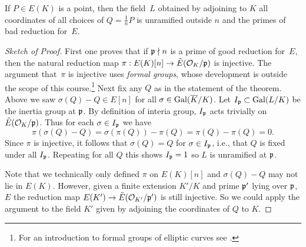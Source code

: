 \begin{theorem}\label{thm:mwunram}
	If $P\in E(K)$ is a point, then the field~$L$ obtained by adjoining to $K$
	all coordinates of all choices of $Q=\frac{1}{n}P$ is unramified
	outside $n$ and the primes of bad reduction for~$E$.
\end{theorem}
\begin{proof}[Sketch of Proof]
	First one proves that if $\mathfrak{p} \nmid n$ is a prime of good reduction
	for~$E$, then the natural reduction map $\pi: E(K)[n] \to
	\tilde{E}(\mathcal{O}_K/\mathfrak{p})$ is injective.  The argument that~$\pi$ is
	injective uses \emph{formal groups}, whose development is outside the
	scope of this course.\footnote{For an introduction to
	formal groups of elliptic curves see \cite[Ch. IV]{silverman:aec}.}
	Next fix any $Q$ as in the statement of the theorem.
	Above we saw $\sigma(Q)-Q \in E[n]$ for
	all $\sigma \in \operatorname{Gal}(\overline{K}/K)$.  Let $I_{\mathfrak{p}}\subset \operatorname{Gal}(L/K)$ be the
	inertia group at $\mathfrak{p}$. By definition of interia group, $I_{\mathfrak{p}}$
	acts trivially on $\tilde{E}(\mathcal{O}_K/\mathfrak{p})$.  Thus for each $\sigma \in
	I_{\mathfrak{p}}$ we have
	$$
		\pi(\sigma(Q) - Q) = \sigma(\pi(Q)) - \pi(Q) = \pi(Q) - \pi(Q) = 0.
	$$
	Since $\pi$ is injective, it follows that $\sigma(Q) = Q$ for $\sigma\in I_{\mathfrak{p}}$,
	i.e., that $Q$ is fixed under all $I_{\mathfrak{p}}$.
	Repeating for all $Q$ this shows $I_{\mathfrak{p}} = 1$ so $L$ is unramified
	at $\mathfrak{p}$.

	Note that we technically only defined $\pi$ on $E(K)[n]$ and
	$\sigma(Q)-Q$ may not lie in $E(K)$. However, given a finite
	extension $K'/K$ and prime $\mathfrak{p}'$ lying over $\mathfrak{p}$, $E$ the
	reduction map $E(K') \to \tilde{E}(\mathcal{O}_{K'}/{\mathfrak{p}'})$ is still injective.
	So we could apply the argument to the field $K'$ given by adjoining
	the coordinates of $Q$ to $K$.
\end{proof}


